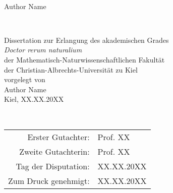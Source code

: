 \documentclass[12pt, openany]{book}
\title{\MYTITLE}
\def\MYAUTHOR{Author Name}
\begin{document}
\thispagestyle{empty}
\begin{center}
\begin{LARGE}
\vspace*{1.2em}
\textbf{\thetitle}\\
\vspace*{.1\paperheight}
\MYAUTHOR
\end{LARGE}
\end{center}
\vfill


\blankpage

\newpage
\thispagestyle{empty}


\begin{center}
\begin{LARGE}
\vspace*{1.2em}
\textbf{\thetitle}\\
\end{LARGE}
\vfill
Dissertation
zur Erlangung des akademischen Grades\\\vspace*{2em}
\textit{Doctor rerum naturalium}\\\vspace*{2em}
der Mathematisch-Naturwissenschaftlichen Fakultät\\
der Christian-Albrechts-Universität zu Kiel\\\vspace*{2em}
vorgelegt von\\
\MYAUTHOR\\\vspace*{2em}
Kiel, XX.XX.20XX
\end{center}

\blankpage
\thispagestyle{empty}
~\vfill

\hfill\begin{tabular}{rl}
    Erster Gutachter: & Prof. XX \\
    Zweite Gutachterin: & Prof. XX \\
    Tag der Disputation: & XX.XX.20XX\\
    Zum Druck genehmigt: & XX.XX.20XX
\end{tabular}{}

\blankpage
\newpage
\renewcommand{\chaptername}{}
\setcounter{page}{1}
\tableofcontents

\newpage
\renewcommand{\chaptername}{}
\renewcommand{\headchapter}{Summary}

\end{document}
